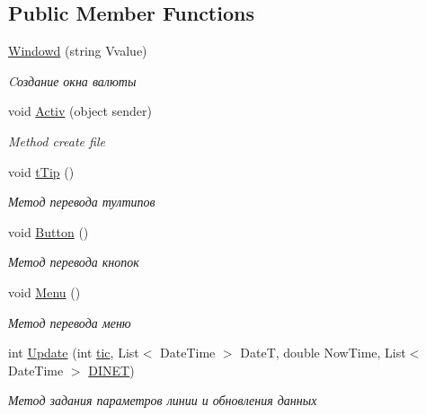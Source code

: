 \subsection*{Public Member Functions}
\begin{DoxyCompactItemize}
\item 
\hyperlink{class_client_1_1_windowd_a8eaca5bbdf54bb33864c1b433ccb63cd}{Windowd} (string Vvalue)
\begin{DoxyCompactList}\small\item\em Cоздание окна валюты \end{DoxyCompactList}\item 
void \hyperlink{class_client_1_1_windowd_a318f722574a5396b688223fcec6e080c}{Activ} (object sender)
\begin{DoxyCompactList}\small\item\em Method create file \end{DoxyCompactList}\item 
void \hyperlink{class_client_1_1_windowd_aa308a6bcf8931b033272affc8076e96a}{t\+Tip} ()
\begin{DoxyCompactList}\small\item\em Метод перевода тултипов \end{DoxyCompactList}\item 
void \hyperlink{class_client_1_1_windowd_a081f7fdb62ef1cefe2ce4dacc45eb41b}{Button} ()
\begin{DoxyCompactList}\small\item\em Метод перевода кнопок \end{DoxyCompactList}\item 
void \hyperlink{class_client_1_1_windowd_a3b7eabc5c91768d6442af8fc585edb87}{Menu} ()
\begin{DoxyCompactList}\small\item\em Метод перевода меню \end{DoxyCompactList}\item 
int \hyperlink{class_client_1_1_windowd_ab924a9e1fb51713d4e42a0dc60301625}{Update} (int \hyperlink{class_client_1_1_windowd_af0c658d1138b70eeafdbc105ec2d7a81}{tic}, List$<$ Date\+Time $>$ DateT, double Now\+Time, List$<$ Date\+Time $>$ \hyperlink{class_client_1_1_windowd_a98b5779ed4abf0571a16deb0c985a7a4}{D\+I\+N\+ET})
\begin{DoxyCompactList}\small\item\em Метод задания параметров линии и обновления данных \end{DoxyCompactList}\item 

\end{DoxyCompactItemize}
